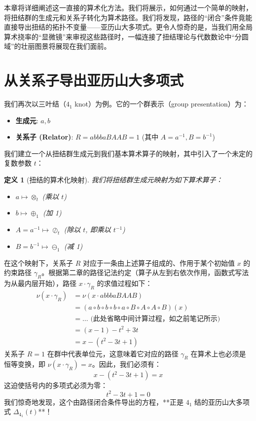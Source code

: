 \documentclass[a4paper,12pt]{book}
\numberwithin{problem}{section}
\newtheorem{definition}{定义}
\numberwithin{definition}{section}
\numberwithin{lemma}{section}
\numberwithin{proposition}{section}
\numberwithin{theorem}{section}
\numberwithin{grammar}{section}
\numberwithin{program}{section}
\numberwithin{convention}{section}
\numberwithin{corollary}{section}
\begin{document}
本章将详细阐述这一直接的算术化方法。我们将展示，如何通过一个简单的映射，将扭结群的生成元和关系子转化为算术路径。我们将发现，路径的“闭合”条件竟能直接导出扭结的拓扑不变量——亚历山大多项式。更令人惊奇的是，当我们用全局算术挠率的“显微镜”来审视这些路径时，一幅连接了扭结理论与代数数论中“分圆域”的壮丽图景将展现在我们面前。

\section{从关系子导出亚历山大多项式}
\label{sec:alexander_from_relator}

我们再次以三叶结（$4_1$ knot）为例。它的一个群表示（group presentation）为：
\begin{itemize}
    \item \textbf{生成元}: $a, b$
    \item \textbf{关系子 (Relator)}: $R = abbbaB AAB = 1$ (其中 $A=a^{-1}, B=b^{-1}$)
\end{itemize}

我们建立一个从扭结群生成元到我们基本算术算子的映射，其中引入了一个未定的复数参数 $t$：
\begin{definition}[扭结的算术化映射]
    \label{def:knot_arithmetization_map}
    我们将扭结群生成元映射为如下算术算子：
    \begin{itemize}
        \item $a \mapsto \otimes_t$ (乘以 $t$)
        \item $b \mapsto \oplus_1$ (加 1)
        \item $A = a^{-1} \mapsto \oslash_t$ (除以 $t$, 即乘以 $t^{-1}$)
        \item $B = b^{-1} \mapsto \ominus_1$ (减 1)
    \end{itemize}
\end{definition}

在这个映射下，关系子 $R$ 对应于一条由上述算子组成的、作用于某个初始值 $x$ 的约束路径 $\gamma_R$。根据第二章的路径记法约定（算子从左到右依次作用，函数式写法为从最内层开始），路径 $x \cdot \gamma_R$ 的求值过程如下：
\begin{align*}
    \nu(x \cdot \gamma_R) &= \nu(x \cdot a b b b a B A A B) \\
    &= (a \circ b \circ b \circ b \circ a \circ B \circ A \circ A \circ B)(x) \\
    &= \dots \text{ (此处省略中间计算过程，如之前笔记所示)} \\
    &= (x - 1) - t^2 + 3t \\
    &= x - (t^2 - 3t + 1)
\end{align*}
关系子 $R=1$ 在群中代表单位元，这意味着它对应的路径 $\gamma_R$ 在算术上也必须是恒等变换，即 $\nu(x \cdot \gamma_R) = x$。因此，我们必须有：
\[
x - (t^2 - 3t + 1) = x
\]
这迫使括号内的多项式必须为零：
\begin{equation}
    t^2 - 3t + 1 = 0
    \label{eq:alexander_4_1}
\end{equation}
我们惊奇地发现，这个由路径闭合条件导出的方程，**正是 $4_1$ 结的亚历山大多项式 $\Delta_{4_1}(t)$**！
\end{document}
